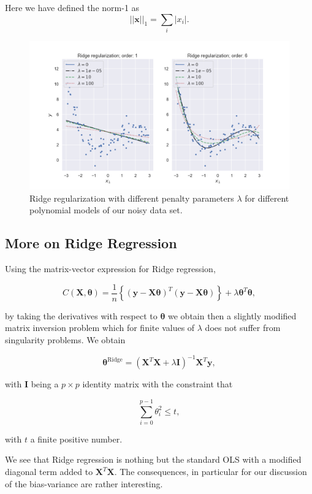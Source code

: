 \documentclass[%
oneside,                 %
final,                   %
10pt]{article}
\begin{document}
Here we have defined the norm-1 as 
\[
\vert\vert \bm{x}\vert\vert_1 = \sum_i \vert x_i\vert. 
\]


\begin{figure}[!ht]  %
  \centerline{\includegraphics[width=0.9\linewidth]{fig/ridge_reg.png}}
  \caption{
  Ridge regularization with different penalty parameters $\lambda$ for different polynomial models of our noisy data set. \label{fig-ridge_reg}
  }
\end{figure}




\subsection{More on Ridge Regression}

Using the matrix-vector expression for Ridge regression,

\[
C(\bm{X},\bm{\theta})=\frac{1}{n}\left\{(\bm{y}-\bm{X}\bm{\theta})^T(\bm{y}-\bm{X}\bm{\theta})\right\}+\lambda\bm{\theta}^T\bm{\theta},
\]

by taking the derivatives with respect to $\bm{\theta}$ we obtain then
a slightly modified matrix inversion problem which for finite values
of $\lambda$ does not suffer from singularity problems. We obtain

\[
\bm{\theta}^{\mathrm{Ridge}} = \left(\bm{X}^T\bm{X}+\lambda\bm{I}\right)^{-1}\bm{X}^T\bm{y},
\]

with $\bm{I}$ being a $p\times p$ identity matrix with the constraint that

\[
\sum_{i=0}^{p-1} \theta_i^2 \leq t,
\]

with $t$ a finite positive number. 

We see that Ridge regression is nothing but the standard
OLS with a modified diagonal term added to $\bm{X}^T\bm{X}$. The
consequences, in particular for our discussion of the bias-variance
are rather interesting.
\end{document}
